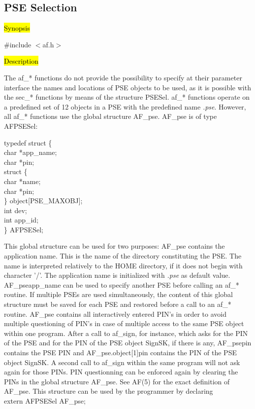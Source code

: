 \subsection{PSE Selection}
\label{cc_sel}

\hl{Synopsis}

\#include $<$af.h$>$

\hl{Description}
     
The af\_* functions do not provide the possibility
to specify at their parameter interface the names and locations of
PSE objects to be used, as it is possible with the sec\_* functions by
means of the structure PSESel. af\_* functions operate on a predefined
set of 12 objects in a PSE with the predefined name {\em .pse}.
However, all af\_* functions use the global structure AF\_pse. AF\_pse is of
type AFPSESel:

{\small
\bvtab
\4 typedef struct \{ \\
\6        char \1    *app\_name; \\
\6        char \1    *pin; \\
\6        struct \{ \\
\8            char \1 *name; \\
\8            char \1 *pin; \\
\6        \}  \1      object[PSE\_MAXOBJ]; \\
\6        int \1     dev; \\
\6        int \1     app\_id; \\
\4 \} AFPSESel; 
\evtab
}

This global structure can be used for two purposes:
\be
\m AF\_pse contains the application name. This is the
   name of the directory constituting the PSE. The name is interpreted 
   relatively to the HOME directory, if it does not begin with character '/'.
   The application name is initialized with {\em .pse} as default value.
   AF\_pse\pf app\_name can be used to specify another PSE before calling
   an af\_* routine. If multiple PSEs are used simultaneously, the content
   of this global structure must be saved for each PSE and restored
   before a call to an af\_* routine.
\m AF\_pse contains all interactively entered PIN's in order to avoid multiple
   questioning of PIN's in case of multiple access to the same PSE object within
   one program. After a call to af\_sign, for instance, which asks for the PIN
   of the PSE and for the PIN of the PSE object SignSK, if there is any,
   AF\_pse\pf pin contains the PSE PIN and AF\_pse.object[1]\pf pin contains the
   PIN of the PSE object SignSK. A second call to af\_sign within the same
   program will not ask again for those PINs. PIN questionning can be
   enforced again by clearing the PINs in the global structure AF\_pse.
   See AF(5) for the exact definition of AF\_pse.
\ee
This structure can be used by the programmer by declaring \\

{\small
extern AFPSESel AF\_pse;
}
